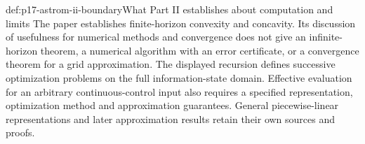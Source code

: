 \begin{proofboundary}{def:p17-astrom-ii-boundary}{What Part II establishes about computation and limits}
The paper establishes finite-horizon convexity and concavity.
Its discussion of usefulness for numerical methods and convergence
does not give an infinite-horizon theorem, a numerical algorithm
with an error certificate, or a convergence theorem for a grid
approximation. The displayed recursion defines successive
optimization problems on the full information-state domain.
Effective evaluation for an arbitrary continuous-control input
also requires a specified representation, optimization method
and approximation guarantees.
General piecewise-linear representations and later approximation
results retain their own sources and proofs.
\end{proofboundary}
